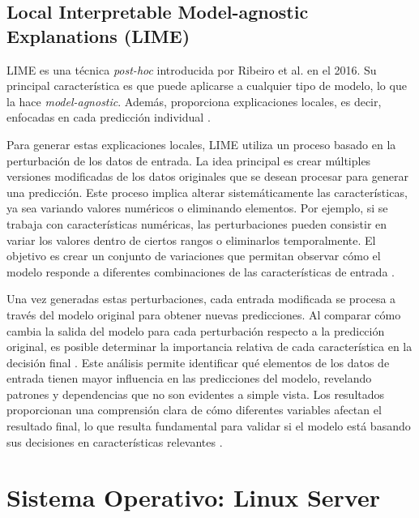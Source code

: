\subsection{Local Interpretable Model-agnostic Explanations (LIME)}

LIME es una técnica \textit{post-hoc} introducida por Ribeiro et al. en el 2016. Su principal característica es que puede aplicarse a cualquier tipo de modelo, lo que la hace \textit{model-agnostic}. Además, proporciona explicaciones locales, es decir, enfocadas en cada predicción individual \cite{ribeiro2016should}. 

Para generar estas explicaciones locales, LIME utiliza un proceso basado en la perturbación de los datos de entrada. La idea principal es crear múltiples versiones modificadas de los datos originales que se desean procesar para generar una predicción. Este proceso implica alterar sistemáticamente las características, ya sea variando valores numéricos o eliminando elementos. Por ejemplo, si se trabaja con características numéricas, las perturbaciones pueden consistir en variar los valores dentro de ciertos rangos o eliminarlos temporalmente. El objetivo es crear un conjunto de variaciones que permitan observar cómo el modelo responde a diferentes combinaciones de las características de entrada \cite{vu2019evaluating}.

Una vez generadas estas perturbaciones, cada entrada modificada se procesa a través del modelo original para obtener nuevas predicciones. Al comparar cómo cambia la salida del modelo para cada perturbación respecto a la predicción original, es posible determinar la importancia relativa de cada característica en la decisión final \cite{vu2019evaluating}. Este análisis permite identificar qué elementos de los datos de entrada tienen mayor influencia en las predicciones del modelo, revelando patrones y dependencias que no son evidentes a simple vista. Los resultados proporcionan una comprensión clara de cómo diferentes variables afectan el resultado final, lo que resulta fundamental para validar si el modelo está basando sus decisiones en características relevantes \cite{ribeiro2016should}. 











\section{Sistema Operativo: Linux Server}

